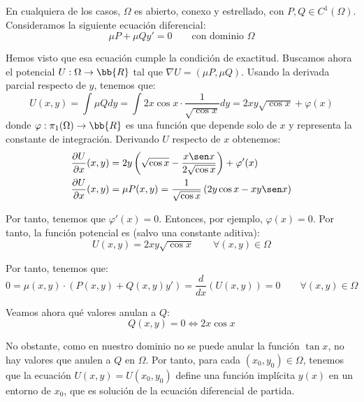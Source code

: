 \begin{ejercicio}
\begin{enumerate}
        En cualquiera de los casos, $\Omega$ es abierto, conexo y estrellado, con $P,Q\in C^1(\Omega)$. Consideramos la siguiente ecuación diferencial:
        \begin{equation*}
            \mu P + \mu Q y' = 0 \qquad \text{con dominio }\Omega
        \end{equation*}

        Hemos visto que esa ecuación cumple la condición de exactitud. Buscamos ahora el potencial $U:\Omega\to\bb{R}$ tal que $\nabla U=(\mu P,\mu Q)$. Usando la derivada parcial respecto de $y$, tenemos que:
        \begin{equation*}
            U(x,y)=\int \mu Q dy = \int 2x\cos x\cdot \dfrac{1}{\sqrt{\cos x}} dy = 2xy\sqrt{\cos x}+\varphi(x)
        \end{equation*}
        donde $\varphi:\pi_1(\Omega)\to\bb{R}$ es una función que depende solo de $x$ y representa la constante de integración. Derivando $U$ respecto de $x$ obtenemos:
        \begin{align*}
            \frac{\partial U}{\partial x}(x,y)&=2y\left(\sqrt{\cos x}-\dfrac{x\sen x}{2\sqrt{\cos x}}\right)+\varphi'(x)\\
            \frac{\partial U}{\partial x}(x,y)&=\mu P(x,y)=\dfrac{1}{\sqrt{\cos x}}\left(2y\cos x - xy\sen x\right)
        \end{align*}

        Por tanto, tenemos que $\varphi'(x)=0$. Entonces, por ejemplo, $\varphi(x)=0$. Por tanto, la función potencial es (salvo una constante aditiva):
        \begin{equation*}
            U(x,y)=2xy\sqrt{\cos x}\qquad \forall (x,y)\in\Omega
        \end{equation*}

        Por tanto, tenemos que:
        \begin{equation*}
            0=\mu(x,y)\cdot (P(x,y)+Q(x,y)y')=\dfrac{d}{dx}\left(U(x,y)\right)=0\qquad \forall (x,y)\in\Omega
        \end{equation*}

        Veamos ahora qué valores anulan a $Q$:
        \begin{equation*}
            Q(x,y)=0 \Longleftrightarrow
            2x \cos x
        \end{equation*}

        No obstante, como en nuestro dominio no se puede anular la función $\tan x$, no hay valores que anulen a $Q$ en $\Omega$. Por tanto, para cada $(x_0, y_0)\in \Omega$, tenemos que la ecuación $U(x,y)=U(x_0,y_0)$ define una función implícita $y(x)$ en un entorno de $x_0$, que es solución de la ecuación diferencial de partida.       

    \end{enumerate}
\end{ejercicio}

